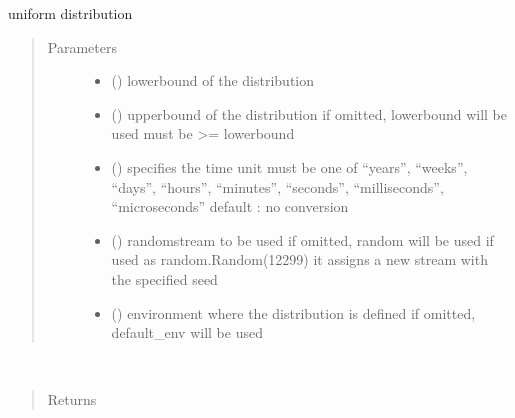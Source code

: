 \documentclass[letterpaper,10pt,english]{sphinxmanual}
\begin{document}
\begin{fulllineitems}
\label{\detokenize{Reference:salabim.Uniform}}
uniform distribution
\begin{quote}\begin{description}
\item[{Parameters}] \leavevmode\begin{itemize}
\item {} 
 () \textendash{} lowerbound of the distribution

\item {} 
 () \textendash{} upperbound of the distribution 
if omitted, lowerbound will be used 
must be \textgreater{}= lowerbound

\item {} 
 () \textendash{} specifies the time unit 
must be one of “years”, “weeks”, “days”, “hours”, “minutes”, “seconds”, “milliseconds”, “microseconds” 
default : no conversion 

\item {} 
 () \textendash{} randomstream to be used 
if omitted, random will be used 
if used as random.Random(12299)
it assigns a new stream with the specified seed

\item {} 
 ({\hyperref[\detokenize{Reference:salabim.Environment}]{}}) \textendash{} environment where the distribution is defined 
if omitted, default\_env will be used

\end{itemize}

\end{description}\end{quote}

\begin{fulllineitems}
\label{\detokenize{Reference:salabim.Uniform.mean}}~\begin{quote}\begin{description}
\item[{Returns}] \leavevmode
{}


\end{description}
\end{quote}
\end{fulllineitems}
\end{fulllineitems}
\end{document}
